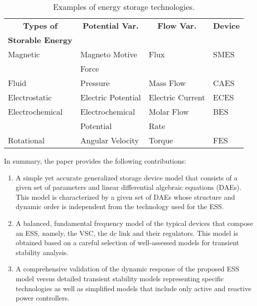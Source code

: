\documentclass[journal, a4paper]{IEEEtran}
\begin{document}
\begin{table}[t]
  \centering
  \caption{Examples of energy storage technologies.}
  \begin{tabular}{| l | l | l | l |}
    \hline
    \multicolumn{1}{|c|}{\bf{Types of}} & 
    \multicolumn{1}{c|}{\bf{Potential Var.}} & 
    \multicolumn{1}{c|}{\bf{Flow Var.}} & 
    \multicolumn{1}{c|}{\bf{Device}} \\ 
    \multicolumn{1}{|c|}{\bf{Storable Energy}} & 
    \multicolumn{1}{c|}{} & 
    \multicolumn{1}{c|}{} & 
    \multicolumn{1}{c|}{}\\ 
    \hline
    \multicolumn{1}{|l|}{Magnetic} & 
    \multicolumn{1}{l|}{Magneto Motive} & 
    \multicolumn{1}{l|}{Flux} & 
    \multicolumn{1}{l|}{SMES} \\ 
    \multicolumn{1}{|l|}{} & 
    \multicolumn{1}{l|}{Force} & 
    \multicolumn{1}{l|}{} & 
    \multicolumn{1}{l|}{}\\ \hline
    Fluid & Pressure & Mass Flow & CAES \\ \hline
    Electrostatic & Electric Potential & Electric Current & ECES \\ \hline
    \multicolumn{1}{|l|}{Electrochemical} & 
    \multicolumn{1}{l|}{Electrochemical} & 
    \multicolumn{1}{l|}{Molar Flow} & 
    \multicolumn{1}{l|}{BES} \\ 
    \multicolumn{1}{|l|}{} & 
    \multicolumn{1}{l|}{Potential} & 
    \multicolumn{1}{l|}{Rate} & 
    \multicolumn{1}{l|}{}\\ 
    \hline
    Rotational & Angular Velocity & Torque & FES\\ 
    \hline
  \end{tabular}
  \label{table:energies}\vspace{-2.5mm}
\end{table} 

In summary, the paper provides the following contributions:
\begin{enumerate}
\item A simple yet accurate generalized storage device model that
  consists of a given set of parameters and linear differential
  algebraic equations (DAEs). This model is characterized by a
  given set of DAEs whose structure and dynamic order is independent
  from the technology used for the ESS. 
\item A balanced, fundamental frequency model of the typical devices
  that compose an ESS, namely, the VSC, the dc link and their
  regulators.  This model is obtained based on a careful
  selection of well-assessed models for transient stability
  analysis. 
\item A comprehensive validation of the dynamic response of the
  proposed ESS model versus detailed transient stability
  models representing specific technologies as well as
  simplified models that include only active and reactive power
  controllers.
\end{enumerate}
\end{document}
